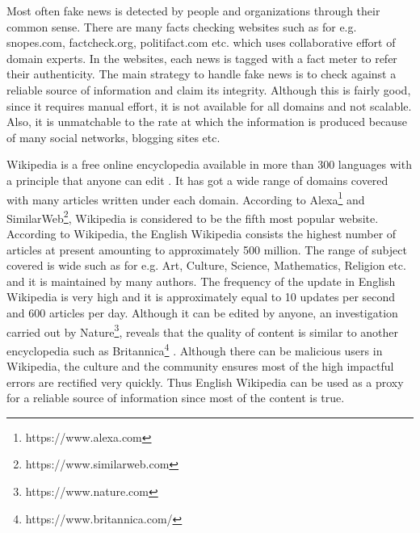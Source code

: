 \documentclass[a4paper, 11pt]{article}
\begin{document}
Most often fake news is detected by people and organizations through their common sense. There are many facts checking websites such as for e.g. snopes.com, factcheck.org, politifact.com etc. which uses collaborative effort of domain experts. In the websites, each news is tagged with a fact meter to refer their authenticity. The main strategy to handle fake news is to check against a reliable source of information and claim its integrity. Although this is fairly good, since it requires manual effort, it is not available for all domains and not scalable. Also, it is unmatchable to the rate at which the information is produced because of many social networks, blogging sites etc.

Wikipedia is a free online encyclopedia available in more than 300 languages with a principle that anyone can edit \cite{Wales2005}. It has got a wide range of domains covered with many articles written under each domain. According to Alexa\footnote{https://www.alexa.com} and SimilarWeb\footnote{https://www.similarweb.com}, Wikipedia is considered to be the fifth most popular website. According to Wikipedia, the English Wikipedia consists the highest number of articles at present amounting to approximately 500 million. The range of subject covered is wide such as for e.g. Art, Culture, Science, Mathematics, Religion etc. and it is maintained by many authors. The frequency of the update in English Wikipedia is very high and it is approximately equal to 10 updates per second and 600 articles per day. Although it can be edited by anyone, an investigation carried out by Nature\footnote{https://www.nature.com}, reveals that the quality of content is similar to another encyclopedia such as Britannica\footnote{https://www.britannica.com/} \cite{Wales2005}. Although there can be malicious users in Wikipedia, the culture and the community ensures most of the high impactful errors are rectified very quickly\cite{Priedhorsky2007}. Thus English Wikipedia can be used as a proxy for a reliable source of information since most of the content is true.
 
\end{document}
